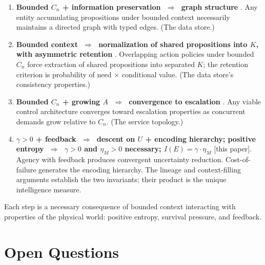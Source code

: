 \documentclass[11pt]{article}
\theoremstyle{definition}
\theoremstyle{remark}
\begin{document}
\begin{enumerate}
\item \textbf{Bounded $C_n$ + information preservation $\;\Rightarrow\;$
      graph structure} \cite{McCarthy2026a}. Any entity accumulating
      propositions under bounded context necessarily maintains a
      directed graph with typed edges. (The data store.)

\item \textbf{Bounded context $\;\Rightarrow\;$ normalization of shared
      propositions into $K$, with asymmetric retention}
      \cite{McCarthy2026b}. Overlapping action policies under bounded
      $C_n$ force extraction of shared propositions into separated $K$;
      the retention criterion is probability of need $\times$ conditional
      value. (The data store's consistency properties.)

\item \textbf{Bounded $C_n$ + growing $A$ $\;\Rightarrow\;$ convergence
      to escalation} \cite{McCarthy2026c}. Any viable control
      architecture converges toward escalation properties as concurrent
      demands grow relative to $C_n$. (The service topology.)

\item \textbf{$\gamma > 0$ + feedback $\;\Rightarrow\;$ descent on $U$
      + encoding hierarchy; positive entropy $\;\Rightarrow\;$
      $\gamma > 0$ and $\eta_M > 0$ necessary;
      $I(E) = \gamma \cdot \eta_M$} [this paper]. Agency with feedback
      produces convergent uncertainty reduction. Cost-of-failure
      generates the encoding hierarchy. The lineage and context-filling
      arguments establish the two invariants; their product is the unique
      intelligence measure.
\end{enumerate}

Each step is a necessary consequence of bounded context interacting
with properties of the physical world: positive entropy, survival
pressure, and feedback.

\section{Open Questions}
\label{sec:open}
\end{document}
